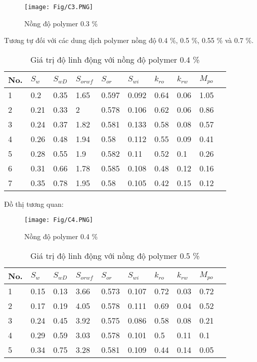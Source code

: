 \documentclass[12pt,a4paper]{article}
\begin{document}
	\begin{figure}[h]
		\centering
		\texttt{[image: Fig/C3.PNG]}
		\caption{Nồng độ polymer 0.3 \%}
	\end{figure}
	\newline
	Tương tự đối với các dung dịch polymer nồng độ 0.4 \%, 0.5 \%, 0.55 \% và 0.7 \%.
	\newpage
\begin{table}[h]
\centering
\caption{Giá trị độ linh động với nồng độ polymer 0.4 \%}
\label{my-label}
\begin{tabularx}{\textwidth}{@{}XXXXXXXXXX@{}}
\toprule
No. & $S_w$ & $S_{wD}$ & $S_{orwf}$ & $S_{or}$ & $S_{wi}$ & $k_{ro}$ & $k_{rw}$ & $M_{po}$ \\ \midrule
1   & 0.2   & 0.35     & 1.65       & 0.597    & 0.092    & 0.64     & 0.06     & 1.05     \\
2   & 0.21  & 0.33     & 2          & 0.578    & 0.106    & 0.62     & 0.06     & 0.86     \\
3   & 0.24  & 0.37     & 1.82       & 0.581    & 0.133    & 0.58     & 0.08     & 0.57     \\
4   & 0.26  & 0.48     & 1.94       & 0.58     & 0.112    & 0.55     & 0.09     & 0.41     \\
5   & 0.28  & 0.55     & 1.9        & 0.582    & 0.11     & 0.52     & 0.1      & 0.26     \\
6   & 0.31  & 0.66     & 1.78       & 0.585    & 0.108    & 0.48     & 0.12     & 0.16     \\
7   & 0.35  & 0.78     & 1.95       & 0.58     & 0.105    & 0.42     & 0.15     & 0.12     \\ \bottomrule
\end{tabularx}
\end{table}
	Đồ thị tương quan:
	\begin{figure}[h]
		\centering
		\texttt{[image: Fig/C4.PNG]}
		\caption{Nồng độ polymer 0.4 \%}
	\end{figure}
	\newpage
\begin{table}[h]
\centering
\caption{Giá trị độ linh động với nồng độ polymer 0.5 \%}
\label{my-label}
\begin{tabularx}{\textwidth}{@{}XXXXXXXXXX@{}}
\toprule
No. & $S_w$ & $S_{wD}$ & $S_{orwf}$ & $S_{or}$ & $S_{wi}$ & $k_{ro}$ & $k_{rw}$ & $M_{po}$ \\ \midrule
1  & 0.15  & 0.13     & 3.66       & 0.573    & 0.107    & 0.72     & 0.03     & 0.72     \\
2  & 0.17  & 0.19     & 4.05       & 0.578    & 0.111    & 0.69     & 0.04     & 0.52     \\
3  & 0.24  & 0.45     & 3.92       & 0.575    & 0.086    & 0.58     & 0.08     & 0.21     \\
4  & 0.29  & 0.59     & 3.03       & 0.578    & 0.101    & 0.5      & 0.11     & 0.1      \\
5  & 0.34  & 0.75     & 3.28       & 0.581    & 0.109    & 0.44     & 0.14     & 0.05     \\ \bottomrule
\end{tabularx}
\end{table}
\end{document}
